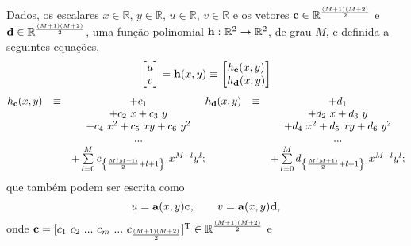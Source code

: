 \begin{myproofT}\label{proof:theo:maphxr2r2}
Dados,
os escalares $x \in \mathbb{R}$, $y \in \mathbb{R}$, $u \in \mathbb{R}$, $v \in \mathbb{R}$ e 
os vetores $\VECTOR{c} \in \mathbb{R}^{\frac{(M+1)(M+2)}{2}}$ e $\VECTOR{d} \in \mathbb{R}^{\frac{(M+1)(M+2)}{2}}$,
uma função polinomial $\VECTOR{h}:\mathbb{R}^2 \rightarrow \mathbb{R}^2$, de grau $M$, e 
definida a seguintes equações,
\begin{equation}\label{eq:proof:theo:maphxr2r2:0}
\begin{bmatrix}
u\\
v
\end{bmatrix}=
\VECTOR{h}(x,y)\equiv
\begin{bmatrix}
h_{\VECTOR{c}}(x,y)\\
h_{\VECTOR{d}}(x,y)
\end{bmatrix}
\end{equation}
\begin{equation}\label{eq:proof:theo:maphxr2r2:1}
\begin{matrix}
h_{\VECTOR{c}}(x,y) & \equiv & +c_{1}\\
              ~ & ~ & +c_{2}~x + c_{3}~y\\
              ~ & ~ & +c_{4}~x^2 +c_{5}~xy + c_{6}~y^2\\
              ~ & ~ &  ...\\
              ~ & ~ & +\sum \limits_{l=0}^{M}c_{\left\{ \frac{M(M+1)}{2}+l+1\right\}}~x^{M-l}y^{l};
\end{matrix}
\begin{matrix}
h_{\VECTOR{d}}(x,y) & \equiv & +d_{1}\\
              ~ & ~ & +d_{2}~x + d_{3}~y\\
              ~ & ~ & +d_{4}~x^2 +d_{5}~xy + d_{6}~y^2\\
              ~ & ~ &  ...\\
              ~ & ~ & +\sum \limits_{l=0}^{M}d_{\left\{ \frac{M(M+1)}{2}+l+1\right\}}~x^{M-l}y^{l};
\end{matrix}  
\end{equation}
que também podem ser escrita como
\begin{equation}
u=\VECTOR{a}(x,y)\VECTOR{c},
\qquad
v=\VECTOR{a}(x,y)\VECTOR{d},
\end{equation}
onde 
$\VECTOR{c}=[c_1~ c_2~ ...~ c_m~ ...~ c_{\frac{(M+1)(M+2)}{2}}]^{\transpose} \in \mathbb{R}^{\frac{(M+1)(M+2)}{2}}$ e

\end{myproofT}
